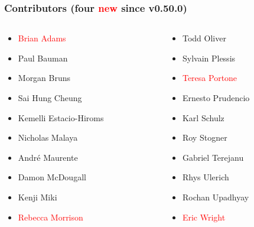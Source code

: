\begin{frame}
  \frametitle{Contributors (four \textcolor{red}{new} since v0.50.0)}
  \begin{columns}[c]
    \begin{column}{11.3cm}
      \begin{columns}[c]
        \begin{column}{5cm}
          \begin{itemize}
            \item[] \textcolor{red}{Brian Adams}
            \item[] Paul Bauman
            \item[] Morgan Bruns
            \item[] Sai Hung Cheung
            \item[] Kemelli Estacio-Hiroms
            \item[] Nicholas Malaya
            \item[] Andr\'e Maurente
            \item[] Damon McDougall
            \item[] Kenji Miki
            \item[] \textcolor{red}{Rebecca Morrison}
          \end{itemize}
        \end{column}
        \begin{column}{5cm}
          \begin{itemize}
            \item[] Todd Oliver
            \item[] Sylvain Plessis
            \item[] \textcolor{red}{Teresa Portone}
            \item[] Ernesto Prudencio
            \item[] Karl Schulz
            \item[] Roy Stogner
            \item[] Gabriel Terejanu
            \item[] Rhys Ulerich
            \item[] Rochan Upadhyay
            \item[] \textcolor{red}{Eric Wright}
          \end{itemize}
        \end{column}
      \end{columns}
    \end{column}
  \end{columns}
\end{frame}

